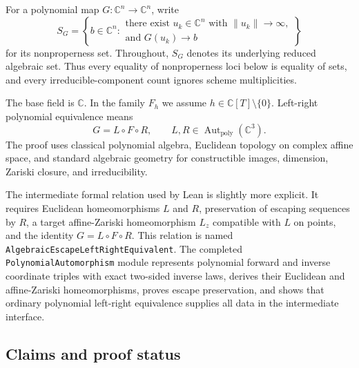 \documentclass[11pt]{article}
\newcommand{\C}{\mathbb{C}}
\newcommand{\Aut}{\operatorname{Aut}}
\begin{document}
For a polynomial map $G:\C^n\to\C^n$, write
\[
 S_G=
 \left\{b\in\C^n:
 \begin{array}{c}
 \text{there exist }u_k\in\C^n\text{ with }\lVert u_k\rVert\to\infty,\\
 \text{and }G(u_k)\to b
 \end{array}
 \right\}
\]
for its nonproperness set.  Throughout, $S_G$ denotes its underlying reduced
algebraic set.  Thus every equality of nonproperness loci below is equality of
sets, and every irreducible-component count ignores scheme multiplicities.

The base field is $\C$.  In the family $F_h$ we assume
$h\in\C[T]\setminus\{0\}$.  Left-right polynomial equivalence means
\[
 G=L\circ F\circ R,
 \qquad L,R\in\Aut_{\mathrm{poly}}(\C^3).
\]
The proof uses classical polynomial algebra, Euclidean topology on complex
affine space, and standard algebraic geometry for constructible images,
dimension, Zariski closure, and irreducibility.

The intermediate formal relation used by Lean is slightly more explicit.  It
requires Euclidean homeomorphisms $L$ and $R$, preservation of escaping
sequences by $R$, a target affine-Zariski homeomorphism $L_z$ compatible with
$L$ on points, and the identity $G=L\circ F\circ R$.  This relation is named
\texttt{AlgebraicEscapeLeftRightEquivalent}.  The completed
\texttt{PolynomialAutomorphism} module represents polynomial forward and
inverse coordinate triples with exact two-sided inverse laws, derives their
Euclidean and affine-Zariski homeomorphisms, proves escape preservation, and
shows that ordinary polynomial left-right equivalence supplies all data in the
intermediate interface.

\subsection{Claims and proof status}
\end{document}
